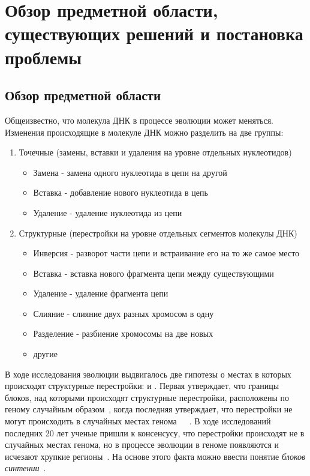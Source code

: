 \chapter{Обзор предметной области, существующих решений и постановка проблемы}

\section{Обзор предметной области}
Общеизвестно, что молекула ДНК в процессе эволюции может меняться.
Изменения происходящие в молекуле ДНК можно разделить на две группы:
\begin{enumerate}
  \item Точечные (замены, вставки и удаления на уровне отдельных нуклеотидов)
    \begin{itemize}
      \item Замена - замена одного нуклеотида в цепи на другой
      \item Вставка - добавление нового нуклеотида в цепь
      \item Удаление - удаление нуклеотида из цепи
    \end{itemize}
  \item Структурные (перестройки на уровне отдельных сегментов молекулы ДНК)
    \begin{itemize}
      \item Инверсия - разворот части цепи и встраивание его на то же самое место
      \item Вставка - вставка нового фрагмента цепи между существующими
      \item Удаление - удаление фрагмента цепи
      \item Слияние - слияние двух разных хромосом в одну
      \item Разделение - разбиение хромосомы на две новых
      \item другие
    \end{itemize}
\end{enumerate}

В ходе исследования эволюции выдвигалось две гипотезы о местах в которых происходят структурные перестройки:  и .
Первая утверждает, что границы блоков, над которыми происходят структурные перестройки, расположены по геному случайным образом~\cite{ohno1973ancient},
когда последняя утверждает,
что перестройки не могут происходить в случайных местах генома~\cite{pevzner2003human}~\cite{webber2005hotspots}~\cite{peng2006fragile}.
В ходе исследований последних 20 лет ученые пришли к консенсусу, что перестройки происходят не в случайных местах генома,
но в процессе эволюции в геноме появляются и исчезают хрупкие регионы~\cite{alekseyev2010comparative}.
На основе этого факта можно ввести понятие \textit{блоков синтении}~\cite{renwick1971mapping}.

